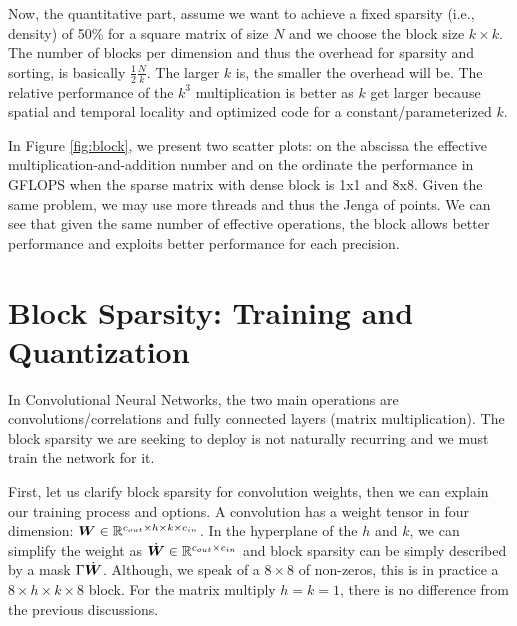 \documentclass[conference]{IEEEtran}
\begin{document}
Now, the quantitative part, assume we want to achieve a fixed sparsity
(i.e., density) of 50\% for a square matrix of size $N$ and we choose
the block size $k \times k$. The number of blocks per dimension and
thus the overhead for sparsity and sorting, is basically
$\frac{1}{2}\frac{N}{k}$. The larger $k$ is, the smaller the overhead
will be.  The relative performance of the $k^3$ multiplication is
better as $k$ get larger because spatial and temporal locality and
optimized code for a constant/parameterized $k$.


In Figure \ref{fig:block}, we present two scatter plots: on the
abscissa the effective multiplication-and-addition number and on the
ordinate the performance in GFLOPS when the sparse matrix with dense
block is 1x1 and 8x8. Given the same problem, we may use more threads
and thus the Jenga of points.  We can see that given the same number
of effective operations, the block allows better performance and
exploits better performance for each precision.



\section{Block Sparsity: Training and Quantization}
\label{sec:training}

In Convolutional Neural Networks, the two main operations are
convolutions/correlations and fully connected layers (matrix
multiplication). The block sparsity we are seeking to deploy is not
naturally recurring and  we must train the network for it.

First, let us clarify block sparsity for convolution weights, then we
can explain our training process and options. A convolution has a
weight tensor in four dimension: ${\boldsymbol W} \in \mathbb{R}^{c_{out}\times h
  \times k \times c_{in}}$. In the hyperplane of the $h$ and $k$, we
can simplify the weight as $\dot{{\boldsymbol W}} \in \mathbb{R}^{c_{out} \times
  c_{in}}$ and block sparsity can be simply described by a mask
$\Gamma\dot{{\boldsymbol W}}$. Although, we speak of a $8\times 8$ of
non-zeros, this is in practice a $8\times h\times k\times 8$
block. For the matrix multiply $h=k=1$, there is no difference from
the previous discussions.
\end{document}
